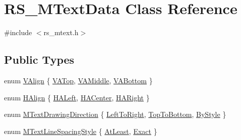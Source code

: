 \hypertarget{classRS__MTextData}{\section{R\-S\-\_\-\-M\-Text\-Data Class Reference}
\label{classRS__MTextData}
}


{\ttfamily \#include $<$rs\-\_\-mtext.\-h$>$}

\subsection*{Public Types}
\begin{DoxyCompactItemize}
\item 
enum \hyperlink{classRS__MTextData_a9f1c092c22fc207e48e1f3f23b93d54f}{V\-Align} \{ \hyperlink{classRS__MTextData_a9f1c092c22fc207e48e1f3f23b93d54fa67c1f953904daa8fb03f62d2d182ed2f}{V\-A\-Top}, 
\hyperlink{classRS__MTextData_a9f1c092c22fc207e48e1f3f23b93d54fafcab99072a77a7a50a5a407f08af0aab}{V\-A\-Middle}, 
\hyperlink{classRS__MTextData_a9f1c092c22fc207e48e1f3f23b93d54fa7887411268b26f69d8a7e543e8a18b5e}{V\-A\-Bottom}
 \}
\item 
enum \hyperlink{classRS__MTextData_ad819fe18c56a345fcfb205705c0445cc}{H\-Align} \{ \hyperlink{classRS__MTextData_ad819fe18c56a345fcfb205705c0445cca11ed5507f0197ab3a9590ca4365b065f}{H\-A\-Left}, 
\hyperlink{classRS__MTextData_ad819fe18c56a345fcfb205705c0445cca79103da08b385441c59678334d35cba9}{H\-A\-Center}, 
\hyperlink{classRS__MTextData_ad819fe18c56a345fcfb205705c0445ccaa47c1e71a2d76474a482c58df0e007ee}{H\-A\-Right}
 \}
\item 
enum \hyperlink{classRS__MTextData_adec4363b7757d3c574a6216049177bb3}{M\-Text\-Drawing\-Direction} \{ \hyperlink{classRS__MTextData_adec4363b7757d3c574a6216049177bb3a2a53f70decb79811f84ca489cd25cbf4}{Left\-To\-Right}, 
\hyperlink{classRS__MTextData_adec4363b7757d3c574a6216049177bb3a89260252140ab8e9ad49194d227a0a4c}{Top\-To\-Bottom}, 
\hyperlink{classRS__MTextData_adec4363b7757d3c574a6216049177bb3a7689693623e9a098fa26771a5665e3f8}{By\-Style}
 \}
\item 
enum \hyperlink{classRS__MTextData_ada9028cb480af4b0365164c6edd4a3ad}{M\-Text\-Line\-Spacing\-Style} \{ \hyperlink{classRS__MTextData_ada9028cb480af4b0365164c6edd4a3ada8bd3781c1a2e1418b6a424383f869255}{At\-Least}, 
\hyperlink{classRS__MTextData_ada9028cb480af4b0365164c6edd4a3ada03c2aa5b5caa589c83e38ffce4490d33}{Exact}
 \}
\end{DoxyCompactItemize}
